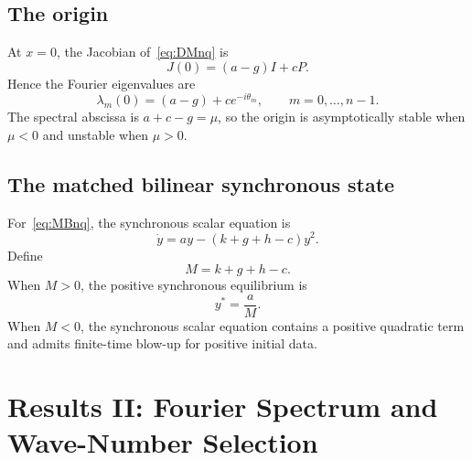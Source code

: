\documentclass[11pt, reqno]{amsart}
\theoremstyle{definition}
\theoremstyle{remark}
\begin{document}

\subsection{The origin}

At $x=0$, the Jacobian of~\eqref{eq:DMnq} is
\begin{equation}
\label{eq:origin-jacobian}
    J(0)=(a-g)I+cP.
\end{equation}
Hence the Fourier eigenvalues are
\begin{equation}
\label{eq:origin-spectrum}
    \lambda_m(0)
    =(a-g)+c e^{-i\theta_m},
    \qquad m=0,\ldots,n-1.
\end{equation}
The spectral abscissa is $a+c-g=\mu$, so the origin is asymptotically stable
when $\mu<0$ and unstable when $\mu>0$.


\subsection{The matched bilinear synchronous state}

For~\eqref{eq:MBnq}, the synchronous scalar equation is
\[
    \dot y
    =a y-(k+g+h-c)y^2.
\]
Define
\begin{equation}
\label{eq:bilinear-M}
    M=k+g+h-c.
\end{equation}
When $M>0$, the positive synchronous equilibrium is
\begin{equation}
\label{eq:bilinear-sync}
    y^*=\frac{a}{M}.
\end{equation}
When $M<0$, the synchronous scalar equation contains a positive quadratic term
and admits finite-time blow-up for positive initial data.


\section{Results II: Fourier Spectrum and Wave-Number Selection}
\label{sec:spectrum}
\end{document}
